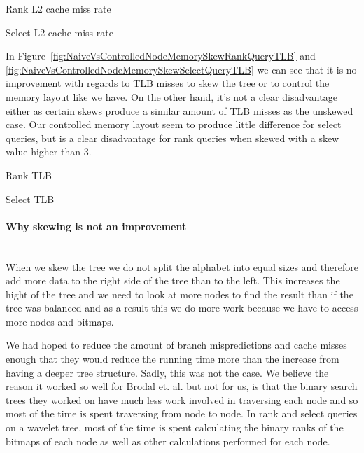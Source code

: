 \figureBegin
\caption{Rank L2 cache miss rate}
\label{fig:NaiveVsControlledNodeMemorySkewRankQuery_L2_DCMrate}

\figureEnd

\figureBegin
\caption{Select L2 cache miss rate}
\label{fig:NaiveVsControlledNodeMemorySkewSelectQuery_L2_DCMrate}

\figureEnd

In Figure~\ref{fig:NaiveVsControlledNodeMemorySkewRankQueryTLB} and \ref{fig:NaiveVsControlledNodeMemorySkewSelectQueryTLB} we can see that it is no improvement with regards to TLB misses to skew the tree or to control the memory layout like we have. On the other hand, it's not a clear disadvantage either as certain skews produce a similar amount of TLB misses as the unskewed case. Our controlled memory layout seem to produce little difference for select queries, but is a clear disadvantage for rank queries when skewed with a skew value higher than 3.

\figureBegin
\caption{Rank TLB}
\label{fig:NaiveVsControlledNodeMemorySkewRankQueryTLB}

\figureEnd

\figureBegin
\caption{Select TLB}
\label{fig:NaiveVsControlledNodeMemorySkewSelectQueryTLB}

\figureEnd


\paragraph{Why skewing is not an improvement}~\\
When we skew the tree we do not split the alphabet into equal sizes and therefore add more data to the right side of the tree than to the left. 
This increases the hight of the tree and we need to look at more nodes to find the result than if the tree was balanced and as a result this we do more work because we have to access more nodes and bitmaps.

We had hoped to reduce the amount of branch mispredictions and cache misses enough that they would reduce the running time more than the increase from having a deeper tree structure.
Sadly, this was not the case. We believe the reason it worked so well for Brodal et. al.\cite{gerthSkewedBinarySearchTrees} but not for us, is that the binary search trees they worked on have much less work involved in traversing each node and so most of the time is spent traversing from node to node.
In rank and select queries on a wavelet tree, most of the time is spent calculating the binary ranks of the bitmaps of each node as well as other calculations performed for each node.

